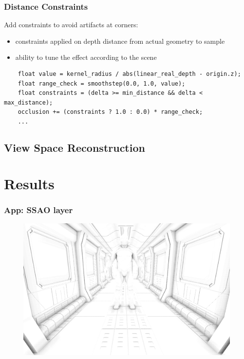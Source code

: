 \documentclass{beamer}
\begin{document}
\begin{frame}[fragile]
\frametitle{Distance Constraints}
Add constraints to avoid artifacts at corners:
\begin{itemize}
    \item constraints applied on depth distance from actual geometry to sample
    \item ability to tune the effect according to the scene
\end{itemize}


\begin{verbatim}
    float value = kernel_radius / abs(linear_real_depth - origin.z);
    float range_check = smoothstep(0.0, 1.0, value);
    float constraints = (delta >= min_distance && delta < max_distance);
    occlusion += (constraints ? 1.0 : 0.0) * range_check;
    ...
\end{verbatim}

\end{frame}

\subsection{View Space Reconstruction}

\section{Results}

\begin{frame}
\frametitle{App: SSAO layer}
\begin{figure}
    \centering
    \includegraphics[width=0.95\linewidth]{images/app_ssao}
\end{figure}

\end{frame}
\end{document}
